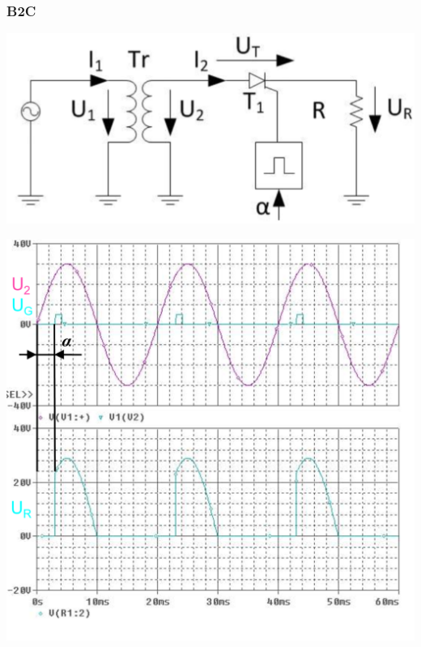 \subsubsection{B2C}
\vspace{-0.5cm}
\begin{minipage}{0.4\linewidth}
    \includegraphics[width=\linewidth]{images/GRM1c}
\end{minipage}
\begin{minipage}{0.35\linewidth}
    \centering 
    \includegraphics[width=\linewidth]{images/M1CKl}
    
\end{minipage}
